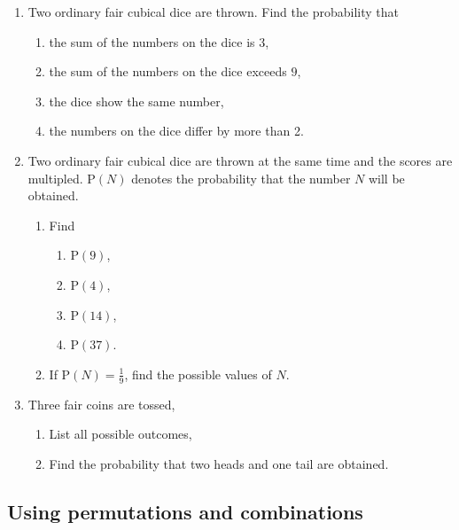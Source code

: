 \begin{enumerate}
\item Two ordinary fair cubical dice are thrown. Find the probability that 

\begin{enumerate}
	\item the sum of the numbers on the dice is $3$,
	\item the sum of the numbers on the dice exceeds $9$,
	\item the dice show the same number,
	\item the numbers on the dice differ by more than 2.
\end{enumerate}

\item Two ordinary fair cubical dice are thrown at the same time and the scores are multipled. $\text{P}(N)$ denotes the probability that the number $N$ will be obtained.

\begin{enumerate}
	\item Find 
	\begin{enumerate}
		\item $\text{P}(9)$,
		\item $\text{P}(4)$,
		\item $\text{P}(14)$,
		\item $\text{P}(37)$.
	\end{enumerate}
\item If $\text{P}(N) = \frac{1}{9}$, find the possible values of $N$.
\end{enumerate}

\item Three fair coins are tossed,
\begin{enumerate}
	\item List all possible outcomes,
	\item Find the probability that two heads and one tail are obtained.
\end{enumerate}




\end{enumerate}

\newpage

\subsection{Using permutations and combinations}


